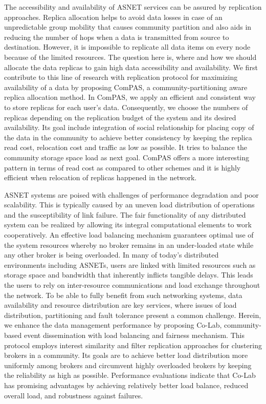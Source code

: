 {The accessibility and availability of ASNET services can be assured by replication approaches. Replica allocation helps to avoid data losses in case of an unpredictable group mobility that causes community partition and also aids in reducing the number of hops when a data is transmitted from source to destination. However, it is impossible to replicate all data items on every node because of the limited resources. The question here is, where and how we should allocate the data replicas to gain high data accessibility and availability.  We first contribute to this line of research with replication protocol for maximizing availability of a data by proposing ComPAS, a community-partitioning aware replica allocation method. In ComPAS, we apply an efficient and consistent way to store replicas for each user's data. Consequently, we choose the numbers of replicas depending on the replication budget of the system and its desired availability. Its goal include integration of social relationship for placing copy of the data in the community to achieve better consistency by keeping the replica read cost, relocation cost and traffic as low as possible. It tries to balance the community storage space load as next goal. ComPAS offers a more interesting pattern in terms of read cost as compared to other schemes and it is highly efficient when relocation of replicas happened in the network.

ASNET systems are poised with challenges of performance degradation and poor scalability. This is typically caused by an uneven load distribution of operations and the susceptibility of link failure. The fair functionality of any distributed system can be realized by allowing its integral computational elements to work cooperatively. An effective load balancing mechanism guarantees optimal use of the system resources whereby no broker remains in an under-loaded state while any other broker is being overloaded. In many of today's distributed environments including ASNETs, users are linked with limited resources such as storage space and bandwidth that inherently inflicts tangible delays. This leads the users to rely on inter-resource communications and load exchange throughout the network. To be able to fully benefit from such networking systems, data availability and resource distribution are key services, where issues of load distribution, partitioning and fault tolerance present a common challenge. Herein, we enhance the data management performance by proposing Co-Lab, community-based event dissemination with load balancing and fairness mechanism. This protocol employs interest similarity and filter replication approaches for clustering brokers in a community. Its goals are to achieve better load distribution more uniformly among brokers and circumvent highly overloaded brokers by keeping the reliability as high as possible. Performance evaluations indicate that Co-Lab has promising advantages by achieving relatively better load balance, reduced overall load, and robustness against failures.

}
